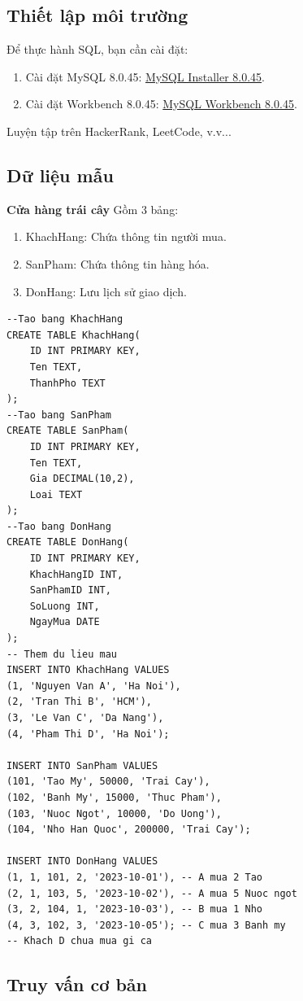 \documentclass[12pt,a4paper]{article}
\begin{document}
\subsection{Thiết lập môi trường}
Để thực hành SQL, bạn cần cài đặt:
\begin{enumerate}
    \item Cài đặt MySQL 8.0.45: \hyperlink{https://dev.mysql.com/downloads/installer/}{MySQL Installer 8.0.45}.
    \item Cài đặt Workbench 8.0.45: \hyperlink{https://dev.mysql.com/downloads/workbench/}{MySQL Workbench 8.0.45}.
\end{enumerate}
Luyện tập trên HackerRank, LeetCode, v.v...
\subsection{Dữ liệu mẫu}
\textbf{Cửa hàng trái cây}
Gồm 3 bảng: 
\begin{enumerate}
    \item KhachHang: Chứa thông tin người mua.
    \item SanPham: Chứa thông tin hàng hóa.
    \item DonHang: Lưu lịch sử giao dịch.
\end{enumerate}
\begin{lstlisting}[style=sqlstyle]
--Tao bang KhachHang
CREATE TABLE KhachHang(
    ID INT PRIMARY KEY,
    Ten TEXT,
    ThanhPho TEXT
);
--Tao bang SanPham
CREATE TABLE SanPham(
    ID INT PRIMARY KEY,
    Ten TEXT,
    Gia DECIMAL(10,2),
    Loai TEXT
);
--Tao bang DonHang
CREATE TABLE DonHang(
    ID INT PRIMARY KEY,
    KhachHangID INT,
    SanPhamID INT,
    SoLuong INT,
    NgayMua DATE
);
-- Them du lieu mau
INSERT INTO KhachHang VALUES 
(1, 'Nguyen Van A', 'Ha Noi'),
(2, 'Tran Thi B', 'HCM'),
(3, 'Le Van C', 'Da Nang'),
(4, 'Pham Thi D', 'Ha Noi');

INSERT INTO SanPham VALUES 
(101, 'Tao My', 50000, 'Trai Cay'),
(102, 'Banh My', 15000, 'Thuc Pham'),
(103, 'Nuoc Ngot', 10000, 'Do Uong'),
(104, 'Nho Han Quoc', 200000, 'Trai Cay');

INSERT INTO DonHang VALUES 
(1, 1, 101, 2, '2023-10-01'), -- A mua 2 Tao
(2, 1, 103, 5, '2023-10-02'), -- A mua 5 Nuoc ngot
(3, 2, 104, 1, '2023-10-03'), -- B mua 1 Nho
(4, 3, 102, 3, '2023-10-05'); -- C mua 3 Banh my
-- Khach D chua mua gi ca
\end{lstlisting}
\subsection{Truy vấn cơ bản}
\end{document}
